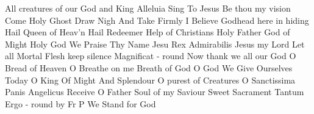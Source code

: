 
All creatures of our God and King
Alleluia Sing To Jesus
Be thou my vision
Come Holy Ghost
Draw Nigh And Take
Firmly I Believe
Godhead here in hiding
Hail Queen of Heav'n
Hail Redeemer
Help of Christians
Holy Father God of Might
Holy God We Praise Thy Name
Jesu Rex Admirabilis
Jesus my Lord
Let all Mortal Flesh keep silence
Magnificat - round
Now thank we all our God
O Bread of Heaven
O Breathe on me Breath of God
O God We Give Ourselves Today
O King Of Might And Splendour 
O purest of Creatures
O Sanctissima
Panis Angelicus
Receive O Father
Soul of my Saviour
Sweet Sacrament
Tantum Ergo - round by Fr P
We Stand for God
